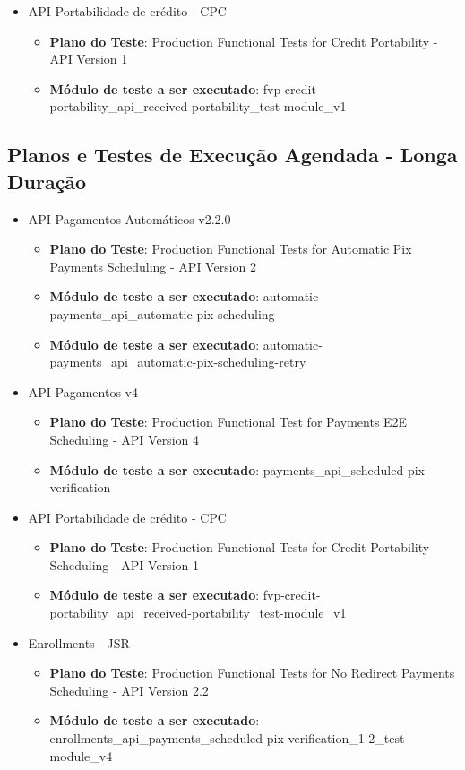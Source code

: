 \begin{itemize}
    \item API Portabilidade de crédito - CPC
    \begin{itemize}
        \item \textbf{Plano do Teste}: Production Functional Tests for Credit Portability - API Version 1
        \item \textbf{Módulo de teste a ser executado}: fvp-credit-portability\_api\_received-portability\_test-module\_v1
    \end{itemize}
\end{itemize}

\subsection{Planos e Testes de Execução Agendada - Longa Duração}

\begin{itemize}
    \item API Pagamentos Automáticos v2.2.0
    \begin{itemize}
        \item \textbf{Plano do Teste}: Production Functional Tests for Automatic Pix Payments Scheduling - API Version 2
        \item \textbf{Módulo de teste a ser executado}: automatic-payments\_api\_automatic-pix-scheduling
        \item \textbf{Módulo de teste a ser executado}: automatic-payments\_api\_automatic-pix-scheduling-retry
    \end{itemize}
    
    \item API Pagamentos v4
    \begin{itemize}
        \item \textbf{Plano do Teste}: Production Functional Test for Payments E2E Scheduling - API Version 4
        \item \textbf{Módulo de teste a ser executado}: payments\_api\_scheduled-pix-verification
    \end{itemize}

    \item API Portabilidade de crédito - CPC
    \begin{itemize}
        \item \textbf{Plano do Teste}: Production Functional Tests for Credit Portability Scheduling - API Version 1
        \item \textbf{Módulo de teste a ser executado}: fvp-credit-portability\_api\_received-portability\_test-module\_v1
    \end{itemize}

    \item Enrollments - JSR
    \begin{itemize}
        \item \textbf{Plano do Teste}: Production Functional Tests for No Redirect Payments Scheduling - API Version 2.2
        \item \textbf{Módulo de teste a ser executado}: enrollments\_api\_payments\_scheduled-pix-verification\_1-2\_test-module\_v4
    \end{itemize}
\end{itemize}

